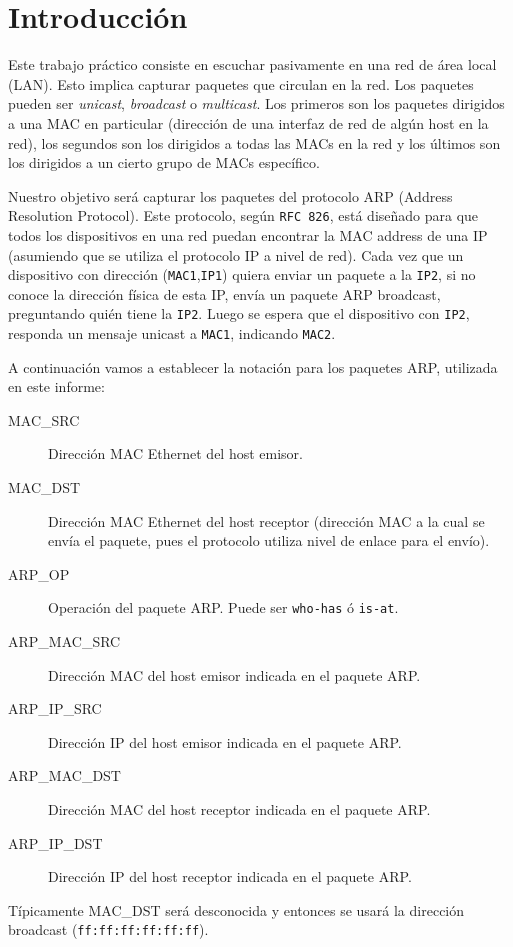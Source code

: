 \section{Introducción} \label{intro}

Este trabajo práctico consiste en escuchar pasivamente en una red de área local (LAN). Esto implica capturar paquetes que circulan
en la red. Los paquetes pueden ser \emph{unicast}, \emph{broadcast} o \emph{multicast}. Los primeros son los paquetes dirigidos a una
MAC en particular (dirección de una interfaz de red de algún host en la red), los segundos son los dirigidos a todas las MACs en la red
y los últimos son los dirigidos a un cierto grupo de MACs específico.

Nuestro objetivo será capturar los paquetes del protocolo ARP (Address Resolution Protocol). Este protocolo, según {\tt RFC 826},
está diseñado para que todos los dispositivos en una red puedan encontrar la MAC address de una IP (asumiendo que se utiliza el protocolo
IP a nivel de red). Cada vez que un dispositivo con dirección ({\tt MAC1},{\tt IP1}) quiera enviar un paquete a la {\tt IP2},
si no conoce la dirección física de esta IP, envía un paquete ARP broadcast, preguntando quién tiene la {\tt IP2}. Luego se espera que
el dispositivo con {\tt IP2}, responda un mensaje unicast a {\tt MAC1}, indicando {\tt MAC2}.

A continuación vamos a establecer la notación para los paquetes ARP, utilizada en este informe:
\begin{description}
 \item[MAC\_SRC] Dirección MAC Ethernet del host emisor.
 \item[MAC\_DST] Dirección MAC Ethernet del host receptor (dirección MAC a la cual se envía el paquete, pues el protocolo utiliza nivel de enlace
 para el envío).
 \item[ARP\_OP] Operación del paquete ARP. Puede ser {\tt who-has} ó {\tt is-at}.
 \item[ARP\_MAC\_SRC] Dirección MAC del host emisor indicada en el paquete ARP.
 \item[ARP\_IP\_SRC] Dirección IP del host emisor indicada en el paquete ARP.
 \item[ARP\_MAC\_DST] Dirección MAC del host receptor indicada en el paquete ARP.
 \item[ARP\_IP\_DST] Dirección IP del host receptor indicada en el paquete ARP.
\end{description}

Típicamente MAC\_DST será desconocida y entonces se usará la dirección broadcast ({\tt ff:ff:ff:ff:ff:ff}).

